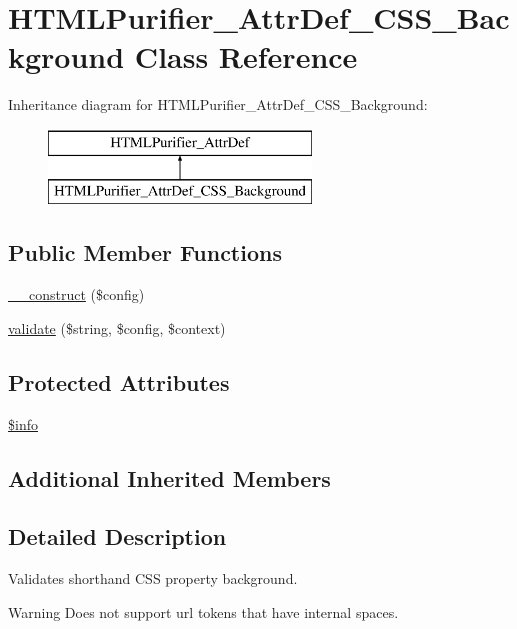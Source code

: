 \hypertarget{classHTMLPurifier__AttrDef__CSS__Background}{\section{H\+T\+M\+L\+Purifier\+\_\+\+Attr\+Def\+\_\+\+C\+S\+S\+\_\+\+Background Class Reference}
\label{classHTMLPurifier__AttrDef__CSS__Background}
}
Inheritance diagram for H\+T\+M\+L\+Purifier\+\_\+\+Attr\+Def\+\_\+\+C\+S\+S\+\_\+\+Background\+:\begin{figure}[H]
\begin{center}
\leavevmode
\includegraphics[height=2.000000cm]{classHTMLPurifier__AttrDef__CSS__Background}
\end{center}
\end{figure}
\subsection*{Public Member Functions}
\begin{DoxyCompactItemize}
\item 
\hyperlink{classHTMLPurifier__AttrDef__CSS__Background_af9eed2a432cc5bcf3b8dea73f28477ce}{\+\_\+\+\_\+construct} (\$config)
\item 
\hyperlink{classHTMLPurifier__AttrDef__CSS__Background_a2ed23ea624d8b2ded7979b33e259b834}{validate} (\$string, \$config, \$context)
\end{DoxyCompactItemize}
\subsection*{Protected Attributes}
\begin{DoxyCompactItemize}
\item 
\hyperlink{classHTMLPurifier__AttrDef__CSS__Background_a7d0f96826ddc1cc7fcd9e7dd605fd6c8}{\$info}
\end{DoxyCompactItemize}
\subsection*{Additional Inherited Members}


\subsection{Detailed Description}
Validates shorthand C\+S\+S property background. \begin{DoxyWarning}{Warning}
Does not support url tokens that have internal spaces. 
\end{DoxyWarning}


